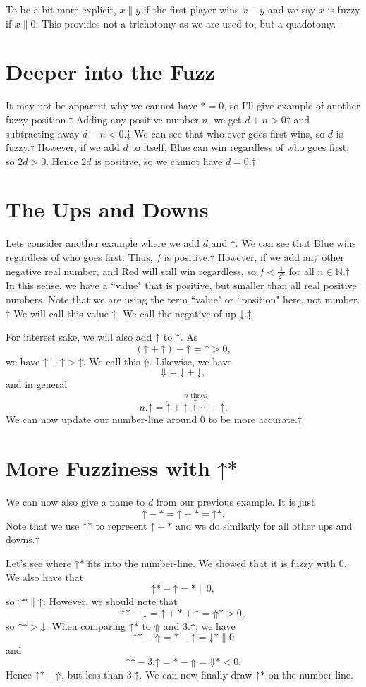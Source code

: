 \documentclass[]{article}
\newcommand{\nextslide}{$\dagger$}
\newcommand{\nextslides}{$\ddagger$}
\newcommand{\fuzzy}{\parallel}
\renewcommand{\star}{\mathord{*}}
\newcommand{\up}{\mathord{\uparrow}}
\newcommand{\doubleup}{\mathord{\Uparrow}}
\newcommand{\down}{\mathord{\downarrow}}
\newcommand{\doubledown}{\mathord{\Downarrow}}
\begin{document}
To be a bit more explicit, $x\fuzzy y$ if the first player wins $x-y$ and we say $x$ is fuzzy if $x\fuzzy 0$. This provides not a trichotomy as we are used to, but a quadotomy.\nextslide{}

\section{Deeper into the Fuzz}
It may not be apparent why we cannot have $\star=0$, so I'll give example of another fuzzy position.\nextslide{} Adding any positive number $n$, we get $d+n>0$\nextslide{} and subtracting away $d-n<0$.\nextslides{} We can see that who ever goes first wins, so $d$ is fuzzy.\nextslide{} However, if we add $d$ to itself, Blue can win regardless of who goes first, so $2d>0$. Hence $2d$ is positive, so we cannot have $d=0$.\nextslide{}

\section{The Ups and Downs}
Lets consider another example where we add $d$ and $\star$. We can see that Blue wins regardless of who goes first. Thus, $f$ is positive.\nextslide{} However, if we add any other negative real number, and Red will still win regardless, so $f<\frac{1}{2^n}$ for all $n\in\mathbb{N}$.\nextslide{} In this sense, we have a ``value" that is positive, but smaller than all real positive numbers. Note that we are using the term ``value" or ``position" here, not number.\nextslide{} We will call this value $\up$. We call the negative of up $\down$.\nextslides{}

For interest sake, we will also add $\up$ to $\up$. As $$\left(\up + \up\right) - \up = \up > 0,$$ we have $\up+\up>\up$. We call this $\doubleup$. Likewise, we have $$\doubledown=\down+\down,$$ and in general $$n.\up=\overbrace{\up+\up+\cdots+\up}^{n\text{ times}}.$$ We can now update our number-line around 0 to be more accurate.\nextslide{}

\section{More Fuzziness with $\up\star$}
We can now also give a name to $d$ from our previous example. It is just $$\up - \star = \up + \star = \up\star.$$ Note that we use $\up\star$ to represent $\up+\star$ and we do similarly for all other ups and downs.\nextslide{}

Let's see where $\up\star$ fits into the number-line. We showed that it is fuzzy with 0. We also have that $$\up\star - \up = \star \fuzzy 0,$$ so $\up\star \fuzzy \up$. However, we should note that $$\up\star - \down = \up + \star + \up = \doubleup\star > 0,$$ so $\up\star>\down$. When comparing $\up\star$ to $\doubleup$ and $3.\star$, we have $$\up\star - \doubleup = \star - \up = \down\star \fuzzy 0$$ and $$\up\star - 3.\up = \star - \doubleup = \doubledown\star < 0.$$ Hence $\up\star \fuzzy \doubleup$, but less than $3.\up$. We can now finally draw $\up\star$ on the number-line.
\end{document}
